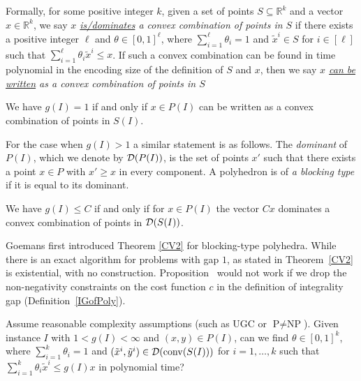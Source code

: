 Formally, for some positive integer $k$, given a set of points $S\subseteq \mathbb{R}^k$ and a vector $x\in \mathbb{R}^k$, we say \textit{$x$ \underline{is/dominates} a convex combination of points in $S$} if there exists a positive integer $\ell$ and $\theta \in [0,1]^\ell$, where $\sum_{i=1}^{\ell}\theta_i =1$ and $\tilde{x}^i\in S$ for $i\in [\ell]$ such that $\sum_{i=1}^{\ell}\theta_i \tilde{x}^i\leq x$. If such a convex combination can be found in time polynomial in the encoding size of the definition of $S$ and $x$, then we say  \textit{$x$ \underline{can be written} as a convex combination of points in $S$}

\begin{proposition}\label{cara}
	We have $g(I)=1$ if and only if $x\in P(I)$ can be written as a convex combination of points in $S(I)$.
\end{proposition}

For the case when $g(I)>1$ a similar statement is as follows. The {\em dominant} of $P(I)$, which we denote by $\operatorname{\mathcal{D}}(P(I))$, is the set of points $x'$ such that there exists a point $x\in P$ with $x'\geq x$ in every component. A polyhedron is of \textit{a blocking type} if it is equal to its dominant.

\begin{thm} \label{CV2}
	We have $g(I) \leq C$ if and only if for $x\in P(I)$ the vector $Cx$ dominates a convex combination of points in $\operatorname{\mathcal{D}}(S(I))$. 
\end{thm}
Goemans \cite{goemansblocking} first introduced Theorem \ref{CV2} for blocking-type polyhedra. While there is an exact algorithm for problems with gap $1$, as stated in Theorem~\ref{CV2} is existential, with no construction. Proposition~\label{cara} would not work if we drop the non-negativity constraints on the cost function $c$ in the definition of integrality gap (Definition~\ref{IGofPoly}).
\iffalse

\begin{question*}\label{question1}
	Assume reasonable complexity assumptions (such as UGC or $\textrm{P}\neq \textrm{NP}$). Given instance $I$ with $1<g(I)<\infty$ and $(x,y)\in P(I)$, can we find $\theta \in [0,1]^k$, where $\sum_{i=1}^{k}\theta_i =1$ and $(\tilde{x}^i,\tilde{y}^i)\in \operatorname{\mathcal{D}}(\operatorname{conv}(S(I)))$ for $i=1,\ldots,k$ such that $\sum_{i=1}^{k}\theta_i \tilde{x}^i\leq g(I)x$ in polynomial time?
\end{question*}

